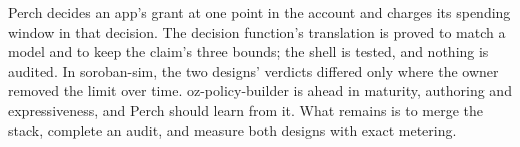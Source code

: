 Perch decides an app's grant at one point in the account and charges its
spending window in that decision. The decision function's translation is proved
to match a model and to keep the claim's three bounds; the shell is tested, and
nothing is audited. In soroban-sim, the two designs' verdicts differed only
where the owner removed the limit over time. oz-policy-builder is ahead in
maturity, authoring and expressiveness, and Perch should learn from it. What
remains is to merge the stack, complete an audit, and measure both designs with
exact metering.
